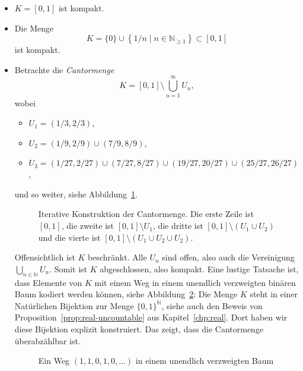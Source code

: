 \documentclass[../main.tex]{subfiles}
\begin{document}
\begin{examples}
  \leavevmode
  \begin{itemize}
    \item $K = [0, 1]$ ist kompakt.
    \item Die Menge
      \[
        K = \{0\} \cup \left\{1/n \mid n \in \mathbb{N}_{\geq 1}\right\} 
        \subset [0, 1]
      \]
      ist kompakt.
    \item 
      Betrachte die \emph{Cantormenge}
      \[
        K = [0, 1] \setminus \bigcup_{n=1}^{\infty} U_n,
      \]
      wobei
      \begin{itemize}
        \item $U_1 = (1/3, 2/3)$,
        \item $U_2 = (1/9, 2/9) \cup (7/9, 8/9)$,
        \item $U_3 = (1/27, 2/27) \cup (7/27, 8/27) \cup (19/27, 20/27) \cup (25/27, 26/27)$,
      \end{itemize}
      und so weiter,
      siehe Abbildung~\ref{fig:cantor}.

      \begin{figure}[htb]
        \centering
        
        \caption{Iterative Konstruktion der
        Cantormenge. Die erste Zeile ist
        $[0, 1]$, die zweite ist
        $[0, 1] \setminus U_1$, die dritte ist
        $[0, 1] \setminus (U_1 \cup U_2)$ und die
        vierte ist $[0, 1] \setminus (U_1 \cup U_2 \cup U_2)$.}%
        \label{fig:cantor}
      \end{figure}

      Offensichtlich ist $K$ beschränkt.
      Alle $U_n$ sind offen, also auch
      die Vereinigung $\bigcup_{n \in \mathbb{N}} U_n$.
      Somit ist $K$ abgeschlossen, also kompakt.
      Eine lustige Tatsache ist,
      dass Elemente von $K$ mit einem Weg
      in einem unendlich
      verzweigten binären Baum kodiert werden können,
      siehe Abbildung~\ref{fig:tree}:
      Die Menge $K$ steht in einer Natürlichen
      Bijektion zur Menge ${\{0, 1\}}^{\mathbb{N}}$,
      siehe auch den Beweis von 
      Proposition~\ref{prop:real-uncountable}
      aus Kapitel~\ref{chp:real}.
      Dort haben wir diese Bijektion explizit konstruiert.
      Das zeigt, dass die Cantormenge überabzählbar ist.

      \begin{figure}[htb]
        \centering
        
        \caption{Ein Weg $(1,1,0,1,0, \dots)$ in einem unendlich
        verzweigten Baum}%
        \label{fig:tree}
      \end{figure}
  \end{itemize}
\end{examples}
\end{document}
